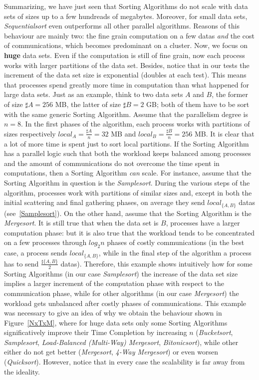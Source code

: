 Summarizing, we have just seen that Sorting Algorithms do not scale with data sets of sizes up to a few hundreads of megabytes. Moreover, for small data sets, \textit{Sequentialsort} even outperforms all other parallel algorithms. Reasons of this behaviour are mainly two: the fine grain computation on a few datas \textit{and} the cost of communications, which becomes predominant on a cluster. Now, we focus on \textbf{huge} data sets. Even if the computation is still of fine grain, now each process works with larger partitions of the data set. Besides, notice that in our tests the increment of the data set size is exponential (doubles at each test). This means that processes spend greatly more time in computation than what happened for large data sets. Just as an example, think to two data sets $A$ and $B$, the former of size $\sharp A = 256$ MB, the latter of size $\sharp B = 2$ GB; both of them have to be sort with the same generic Sorting Algorithm. Assume that the parallelism degree is $n=8$. In the first phases of the algorithm, each process works with partitions of sizes respectively $local_A = \frac{\sharp A}{n} = 32$ MB and $local_B = \frac{\sharp B}{n} = 256$ MB. It is clear that a lot of more time is spent just to sort local partitions. If the Sorting Algorithm has a parallel logic such that both the workload keeps balanced among processes and the amount of communications do not overcome the time spent in computations, then a Sorting Algorithm \textit{can} scale. For instance, assume that the Sorting Algorithm in question is the \textit{Samplesort}. During the various steps of the algorithm, processes work with partitions of similar sizes and, except in both the initial scattering and final gathering phases, on average they send $local_{\lbrace A,B \rbrace}$ datas (see~\ref{Samplesort}). On the other hand, assume that the Sorting Algorithm is the \textit{Mergesort}. It is still true that when the data set is $B$, processes have a larger computation phase: but it is also true that the workload tends to be concentrated on a few processes through $log_2{n}$ phases of costly communications (in the best case, a process sends $local_{\lbrace A,B \rbrace}$, while in the final step of the algorithm a process has to send $\frac{\sharp\lbrace A,B\rbrace}{2}$ datas). Therefore, this example shows intuitively how for some Sorting Algorithms (in our case \textit{Samplesort}) the increase of the data set size implies a larger increment of the computation phase with respect to the communication phase, while for other algorithms (in our case \textit{Mergesort}) the workload gets unbalanced after costly phases of communications. This example was necessary to give an idea of why we obtain the behaviour shown in Figure~\ref{NxTxM}, where for huge data sets only some Sorting Algorithms significatively improve their Time Completion by increasing $n$ (\textit{Bucketsort}, \textit{Samplesort}, \textit{Load-Balanced (Multi-Way) Mergesort}, \textit{Bitonicsort}), while other either do not get better (\textit{Mergesort}, \textit{4-Way Mergesort}) or even worsen (\textit{Quicksort}). However, notice that in every case the scalability is far away from the ideality. 

